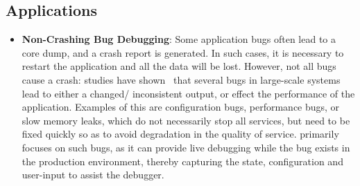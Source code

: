 \subsection{Applications}
\label{sec:impact}


\begin{itemize}[leftmargin=*,topsep=0pt,itemsep=-1ex,partopsep=1ex,parsep=1ex]

\item \textbf{Non-Crashing Bug Debugging}: 
Some application bugs often lead to a core dump, and a crash report is generated. 
In such cases, it is necessary to restart the application and all the data will be lost. 
However,  not all bugs cause a crash: studies have shown~\cite{Zhang:2013:ADS:2486788.2486830, liu2005mining, kremenek2007factor} that several bugs in large-scale systems lead to either a changed/ inconsistent output, or effect the performance of the application. 
Examples of this are configuration bugs, performance bugs, or slow memory leaks, which do not necessarily stop all services, but need to be fixed quickly so as to avoid degradation in the quality of service. 
\parikshan primarily focuses on such bugs, as it can provide live debugging while the bug exists in the production environment, thereby capturing the state, configuration and user-input to assist the debugger.


\end{itemize}
